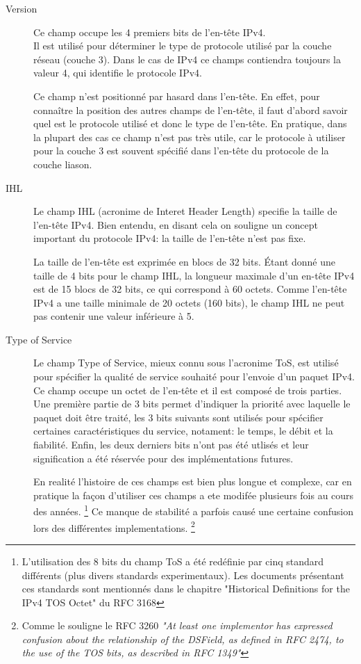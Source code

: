 \begin{description}
\item [Version] 
Ce champ occupe les 4 premiers bits de l'en-tête IPv4.\\
Il est utilisé pour déterminer le type de protocole utilisé par la couche
réseau (couche 3). Dans le cas de IPv4 ce champs contiendra toujours la valeur
4, qui identifie le protocole IPv4.

Ce champ n'est positionné par hasard dans l'en-tête. En effet, pour
connaître la position des autres champs de l'en-tête, il faut d'abord savoir
quel est le protocole utilisé et donc le type de l'en-tête.
En pratique, dans la plupart des cas ce champ n'est pas très utile, car le
protocole à utiliser pour la couche 3 est souvent spécifié dans l'en-tête du
protocole de la couche liason.

\item [IHL]
Le champ IHL (acronime de Interet Header Length) specifie la taille de l'en-tête IPv4. 
Bien entendu, en disant cela on souligne un concept important du protocole IPv4: 
la taille de l'en-tête n'est pas fixe.

La taille de l'en-tête est exprimée en blocs de 32 bits. Étant donné une taille de
4 bits pour le champ IHL, la longueur maximale d'un en-tête IPv4 est de 15 blocs de
32 bits, ce qui correspond à 60 octets. Comme l'en-tête IPv4 a une taille minimale
de 20 octets (160 bits), le champ IHL ne peut pas contenir une valeur inférieure à 5.

\item [Type of Service]
Le champ Type of Service, mieux connu sous l'acronime ToS, est utilisé pour 
spécifier la qualité de service souhaité pour l'envoie d'un paquet IPv4.
Ce champ occupe un octet de l'en-tête et il est composé de trois parties.
Une première partie de 3 bits permet d'indiquer la priorité avec laquelle
le paquet doit être traité, les 3 bits suivants sont utilisés pour spécifier 
certaines caractéristiques du service, notament: le temps, le débit et la fiabilité.
Enfin, les deux derniers bits n'ont pas été utlisés et leur signification a été 
réservée pour des implémentations futures.

En realité l'histoire de ces champs est bien plus longue et complexe,
car en pratique la façon d'utiliser ces champs a ete modifée plusieurs fois au 
cours des années.
\footnote{L'utilisation des 8 bits du champ ToS a été redéfinie
par cinq standard différents (plus divers standards experimentaux).
Les documents présentant ces standards sont mentionnés dans le chapitre 
"Historical Definitions for the IPv4 TOS Octet" du RFC 3168}
Ce manque de stabilité a parfois causé une certaine confusion lors des différentes implementations.
\footnote{Comme le souligne le RFC 3260 {\it "At least one implementor has expressed confusion about the
relationship of the DSField, as defined in RFC 2474, to the use of
the TOS bits, as described in RFC 1349"}}


\end{description}
